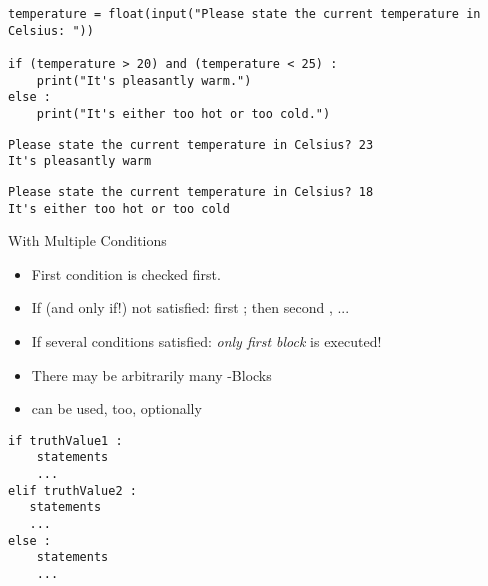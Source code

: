 
\begin{frame}[fragile]
%
\begin{codebox}[Example]
\begin{verbatim}
temperature = float(input("Please state the current temperature in Celsius: "))

if (temperature > 20) and (temperature < 25) :
    print("It's pleasantly warm.")
else :
    print("It's either too hot or too cold.")
\end{verbatim}
\end{codebox}
%
\begin{cmdbox}[Output 1]
\begin{verbatim}
Please state the current temperature in Celsius? 23
It's pleasantly warm
\end{verbatim}
\end{cmdbox}
%
\begin{cmdbox}[Output 2]
\begin{verbatim}
Please state the current temperature in Celsius? 18
It's either too hot or too cold
\end{verbatim}
\end{cmdbox}
%
\end{frame}


\begin{frame}[fragile]{ With Multiple Conditions}
%
\begin{minipage}[t]{.49\linewidth}
\begin{itemize}
\item First condition is checked first.
\item If (and only if!) not satisfied: first ; then second , ...
\item If several conditions satisfied: \emph{only first block} is executed!
\item There may be arbitrarily many -Blocks
\item {} can be used, too, optionally
\end{itemize}
\end{minipage}
%
\begin{minipage}[t]{.49\linewidth}
\phantom{x}
\begin{codebox}
\begin{verbatim}
if truthValue1 :
    statements
    ...
elif truthValue2 :
   statements
   ...
else :
    statements
    ...
\end{verbatim}
\end{codebox}
\end{minipage}
%
\end{frame}

